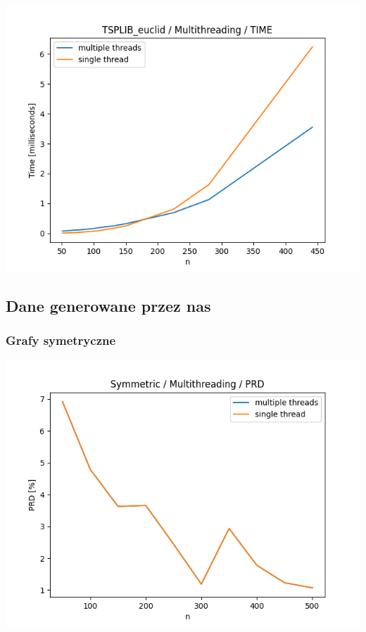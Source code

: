 \documentclass{article}
\begin{document}
\begin{center}
\includegraphics[width=\textwidth, 
                   height = 0.4\textheight, 
                   keepaspectratio]
                  {plots/multithreading_tsplib_euclid_time} 
\end{center}


\subsection{Dane generowane przez nas}


\subsubsection{Grafy symetryczne}

\begin{center}
\includegraphics[width=\textwidth, 
                   height = 0.4\textheight, 
                   keepaspectratio]
                  {plots/multithreading_symmetric_prd} 
\end{center}
\end{document}
